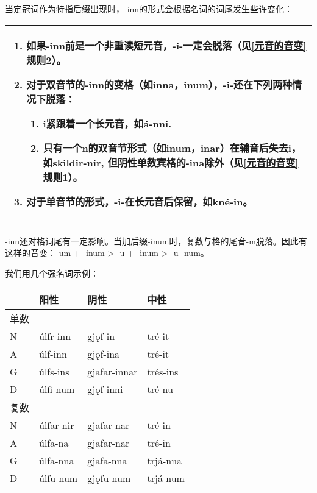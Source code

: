 当定冠词作为特指后缀出现时，-inn的形式会根据名词的词尾发生些许变化：

\begin{longtable}{l}
  \toprule
  \begin{enumerate}\def\labelenumi{\arabic{enumi})}\item  如果-inn前是一个非重读短元音，-i-一定会脱落（见\ref{元音的音变}规则2）。\item  对于双音节的-inn的变格（如inna，inum），-i-还在下列两种情况下脱落：  \begin{enumerate}  \def\labelenumii{\roman{enumii}.}  \item    i紧跟着一个长元音，如á-nni.  \item    只有一个n的双音节形式（如inum，inar）在辅音后失去i，如skildir-nir,    但阴性单数宾格的-ina除外（见\ref{元音的音变}规则1）。  \end{enumerate}\item  对于单音节的形式，-i-在长元音后保留，如kné-in。\end{enumerate} \\
  \midrule
  \endhead
  \bottomrule
  \endfoot
\end{longtable}

-inn还对格词尾有一定影响。当加后缀-inum时，复数与格的尾音-m脱落。因此有这样的音变：-um
+ -inum \textgreater{} -u + -inum \textgreater{} -u -num。

我们用几个强名词示例：

\begin{longtable}{llll}
  \toprule
       & 阳性      & 阴性         & 中性     \\
  \midrule
  \endhead
  \bottomrule
  \endfoot
  单数 &           &              &          \\
  N    & úlfr-inn  & gjǫf-in      & tré-it   \\
  A    & úlf-inn   & gjǫf-ina     & tré-it   \\
  G    & úlfs-ins  & gjafar-innar & trés-ins \\
  D    & úlfi-num  & gjǫf-inni    & tré-nu   \\
  复数 &           &              &          \\
  N    & úlfar-nir & gjafar-nar   & tré-in   \\
  A    & úlfa-na   & gjafar-nar   & tré-in   \\
  G    & úlfa-nna  & gjafa-nna    & trjá-nna \\
  D    & úlfu-num  & gjǫfu-num    & trjá-num \\
\end{longtable}

